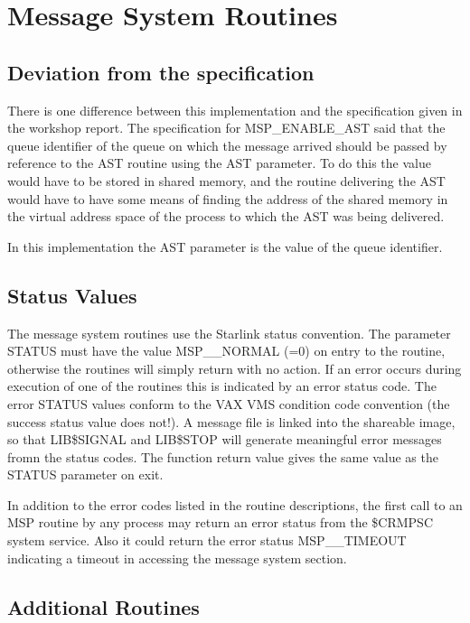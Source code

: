 \newpage

\section{Message System Routines}

\subsection{Deviation from the specification}

There is one difference between this implementation and the
specification given in the workshop report. The specification
for MSP\_ENABLE\_AST said that the queue identifier of the queue
on which the message arrived should be passed by reference to the
AST routine using the AST parameter. To do this the value would have
to be stored in shared memory, and the routine delivering the AST would
have to have some means of finding the address of the shared memory in the
virtual address space of the process to which the AST was being delivered.

In this implementation the AST parameter is the value of the
queue identifier.

\subsection{Status Values}

The message system routines use the Starlink status convention.
The parameter STATUS must have the value MSP\_\_NORMAL (=0) on entry to
the routine, otherwise the routines will simply return with no action.
If an error occurs during execution of one of the routines this is indicated
by an error status code. The error STATUS values conform to the VAX VMS
condition code convention (the success status value does not!). A message
file is linked into the shareable image, so that LIB\$SIGNAL and LIB\$STOP
will generate meaningful error messages fromn the status codes. The function
return value gives the same value as the STATUS parameter on exit.

In addition to the error codes listed in the routine descriptions, the
first call to an MSP routine by any process may return an error status from
the \$CRMPSC system service. Also it could return the error status
MSP\_\_TIMEOUT indicating a timeout in accessing the message system section.

\subsection{Additional Routines}

